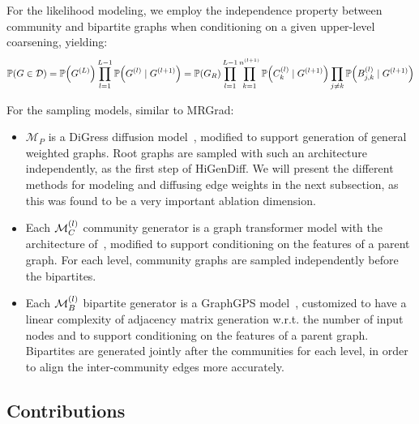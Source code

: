 For the likelihood modeling, we employ the independence property between community and bipartite graphs when conditioning on a given upper-level coarsening, yielding:
\begin{equation}
\mathbb{P}\mathopen{}\left(G \in \mathcal{D}\right)=\mathbb{P}\mathopen{}\left(G^{\mathopen{}\left(L\right)}\right)\prod_{l=1}^{L-1}{\mathbb{P}\mathopen{}\left(G^{\mathopen{}\left(l\right)} \mid G^{\mathopen{}\left(l+1\right)}\right)}=\mathbb{P}\mathopen{}\left(G_R\right)\prod_{l=1}^{L-1}\prod_{k=1}^{n^{\mathopen{}\left(l+1\right)}}{\mathbb{P}\mathopen{}\left(C_{k}^{\mathopen{}\left(l\right)} \mid G^{\mathopen{}\left(l+1\right)}\right)}\prod_{j \neq k}{\mathbb{P}\mathopen{}\left(B_{j,k}^{\mathopen{}\left(l\right)} \mid G^{\mathopen{}\left(l+1\right)}\right)}     
\end{equation}

For the sampling models, similar to MRGrad:
\begin{itemize}
    \item $\mathcal{M}_P$ is a DiGress diffusion model~\cite{vignac_digress_2022}, modified to support generation of general weighted graphs. Root graphs are sampled with such an architecture independently, as the first step of HiGenDiff. We will present the different methods for modeling and diffusing edge weights in the next subsection, as this was found to be a very important ablation dimension. 
    \item Each $\mathcal{M}^{\mathopen{}\left(l\right)}_C$ community generator is a graph transformer model with the architecture of~\cite{dwivedi_generalization_2021}, modified to support conditioning on the features of a parent graph. For each level, community graphs are sampled independently before the bipartites.
    \item Each $\mathcal{M}^{\mathopen{}\left(l\right)}_B$ bipartite generator is a GraphGPS model~\cite{rampasek_recipe_2022}, customized to have a linear complexity of adjacency matrix generation w.r.t. the number of input nodes and to support conditioning on the features of a parent graph. Bipartites are generated jointly after the communities for each level, in order to align the inter-community edges more accurately.
\end{itemize}

\subsection{Contributions}

